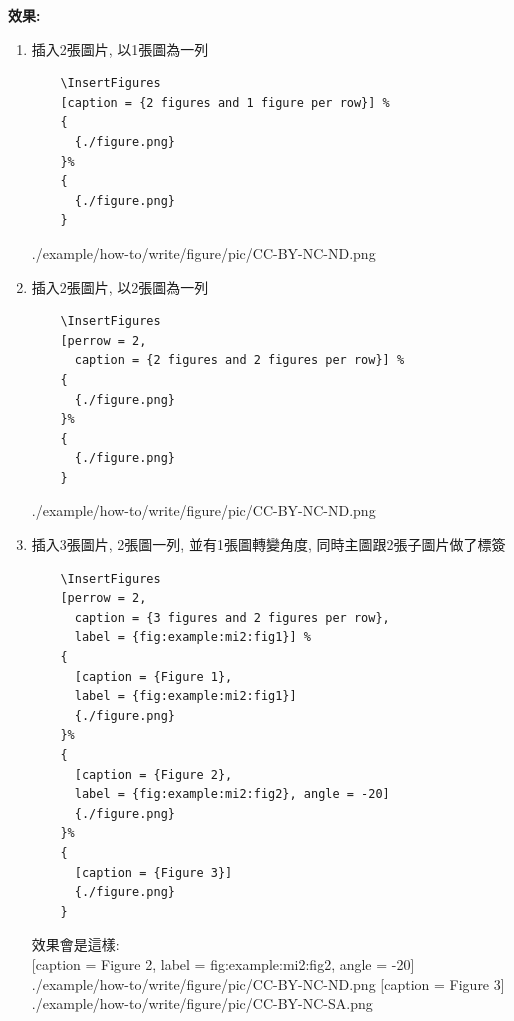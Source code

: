   {\bf 效果:}
  \begin{enumerate}
  \item
  {
    插入2張圖片, 以1張圖為一列
    \begin{verbatim}
    \InsertFigures
    [caption = {2 figures and 1 figure per row}] %
    {
      {./figure.png}
    }%
    {
      {./figure.png}
    }
    \end{verbatim}
    {
      {./example/how-to/write/figure/pic/CC-BY-NC-ND.png}
    }
  } %


  \item
  {
    插入2張圖片, 以2張圖為一列
    \begin{verbatim}
    \InsertFigures
    [perrow = 2,
      caption = {2 figures and 2 figures per row}] %
    {
      {./figure.png}
    }%
    {
      {./figure.png}
    }
    \end{verbatim}
    {
      {./example/how-to/write/figure/pic/CC-BY-NC-ND.png}
    }
  } %

  \newpage
  \item
  {
    插入3張圖片, 2張圖一列, 並有1張圖轉變角度, 同時主圖跟2張子圖片做了標簽
    \begin{verbatim}
    \InsertFigures
    [perrow = 2,
      caption = {3 figures and 2 figures per row},
      label = {fig:example:mi2:fig1}] %
    {
      [caption = {Figure 1},
      label = {fig:example:mi2:fig1}]
      {./figure.png}
    }%
    {
      [caption = {Figure 2},
      label = {fig:example:mi2:fig2}, angle = -20]
      {./figure.png}
    }%
    {
      [caption = {Figure 3}]
      {./figure.png}
    }
    \end{verbatim}

    效果會是這樣: \\
    {
      [caption = {Figure 2},
      label = {fig:example:mi2:fig2},
      angle = -20]
      {./example/how-to/write/figure/pic/CC-BY-NC-ND.png}
    }%
    {
      [caption = {Figure 3}]
      {./example/how-to/write/figure/pic/CC-BY-NC-SA.png}
    }%

}
\end{enumerate}

